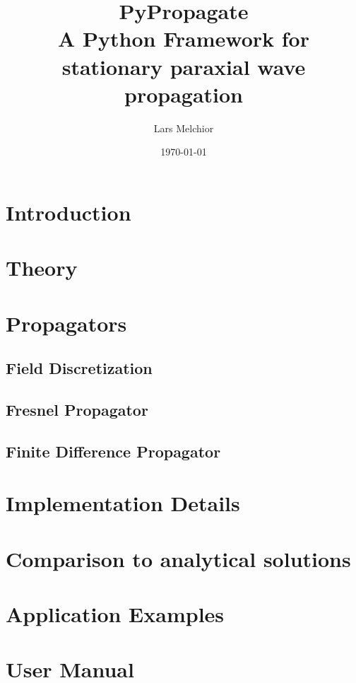 \documentclass{article}
\title{PyPropagate \\ A Python Framework for stationary paraxial wave propagation}
\author{Lars Melchior }
\date{\today}
\begin{document}
\maketitle
\clearpage
\tableofcontents
\clearpage

\section{Introduction}

\clearpage

\section{Theory}

\clearpage


\clearpage

\section{Propagators}
\subsection{Field Discretization}

\clearpage

\subsection{Fresnel Propagator \label{sec:fresnel_propagator}}

\clearpage
 
\subsection{Finite Difference Propagator \label{sec:finite_differences_propagator}}

\clearpage

\section{Implementation Details}

\clearpage

\section{Comparison to analytical solutions}

\clearpage

\clearpage

\section{Application Examples}
\clearpage

\section{User Manual}

\clearpage


\end{document}
